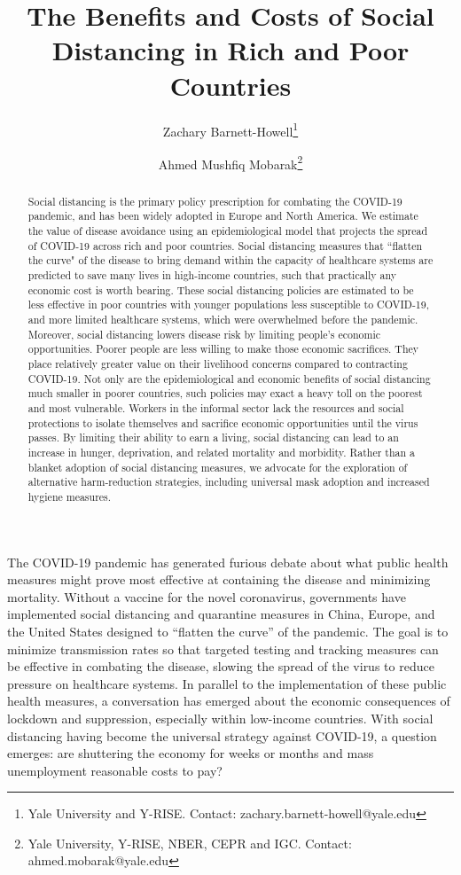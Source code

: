 \documentclass[11pt]{article}
\author{Zachary Barnett-Howell\thanks{Yale University and Y-RISE. Contact: zachary.barnett-howell@yale.edu} \and Ahmed Mushfiq Mobarak\thanks{Yale University, Y-RISE, NBER, CEPR and IGC. Contact: ahmed.mobarak@yale.edu} }
\title{The Benefits and Costs of Social Distancing in Rich and Poor Countries}
\begin{document}
\maketitle

\begin{abstract}
    
Social distancing is the primary policy prescription for combating the COVID-19 pandemic, and has been widely adopted in Europe and North America. We estimate the value of disease avoidance using an epidemiological model that projects the spread of COVID-19 across rich and poor countries. Social distancing measures that ``flatten the curve" of the disease to bring demand within the capacity of healthcare systems are predicted to save many lives in high-income countries, such that practically any economic cost is worth bearing. These social distancing policies are estimated to be less effective in poor countries with younger populations less susceptible to COVID-19, and more limited healthcare systems, which were overwhelmed before the pandemic. Moreover, social distancing lowers disease risk by limiting people's economic opportunities. Poorer people are less willing to make those economic sacrifices. They place relatively greater value on their livelihood concerns compared to contracting COVID-19. Not only are the epidemiological and economic benefits of social distancing much smaller in poorer countries, such policies may exact a heavy toll on the poorest and most vulnerable. Workers in the informal sector lack the resources and social protections to isolate themselves and sacrifice economic opportunities until the virus passes. By limiting their ability to earn a living, social distancing can lead to an increase in hunger, deprivation, and related mortality and morbidity. Rather than a blanket adoption of social distancing measures, we advocate for the exploration of alternative harm-reduction strategies, including universal mask adoption and increased hygiene measures.

\end{abstract}


\doublespacing

The COVID-19 pandemic has generated furious debate about what public health measures might prove most effective at containing  the disease and minimizing mortality. Without a vaccine for the novel coronavirus, governments have implemented social distancing and quarantine measures in China, Europe, and the United States designed to ``flatten the curve'' of the pandemic. The goal is to minimize transmission rates so that targeted testing and tracking measures can be effective in combating the disease, slowing the spread of the virus to reduce pressure on healthcare systems. %
In parallel to the implementation of these public health measures, a conversation has emerged about the economic consequences of lockdown and suppression, especially within low-income countries. With social distancing having become the universal strategy against COVID-19, a question emerges: are shuttering the economy for weeks or months and mass unemployment reasonable costs to pay? 
\end{document}
